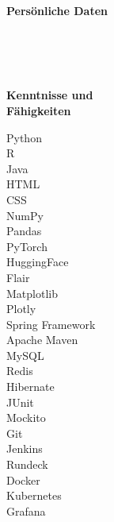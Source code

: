 \documentclass[10pt,a4paper,ragged2e,withhyper]{altacv}
\renewcommand{\cvsectionfont}{\Large\sffamily\bfseries}
\renewcommand{\cvsection}[2][]{%
  \nointerlineskip\bigskip%
  \ifstrequal{#1}{}{}{\marginpar{\vspace*{\dimexpr1pt-\baselineskip}\raggedright}}%
  {\color{heading}\cvsectionfont{#2}}\\[-1ex]%
  \makebox[0pt][l]{\color{headingrule}\rule{\dimexpr\linewidth+0.25cm}{1pt}}\par\medskip
}
\begin{document}



\begin{paracol}{2}

\cvsection{Persönliche Daten}

\\[1em]
\\[1em]
\\

\vspace{1.5em}

\cvsection{Kenntnisse und\\[0.3em] Fähigkeiten}

Python\\[1em]
R\\[1em]
Java\\[1em]
HTML\\[1em]
CSS\\[1em]
NumPy\\[1em]
Pandas\\[1em]
PyTorch\\[1em]
HuggingFace\\[1em]
Flair\\[1em]
Matplotlib\\[1em]
Plotly\\[1em]
Spring Framework\\[1em]
Apache Maven\\[1em]
MySQL\\[1em]
Redis\\[1em]
Hibernate\\[1em]
JUnit\\[1em]
Mockito\\[1em]
Git\\[1em]
Jenkins\\[1em]
Rundeck\\[1em]
Docker\\[1em]
Kubernetes\\[1em]
Grafana\\[1em]


\end{paracol}
\end{document}
